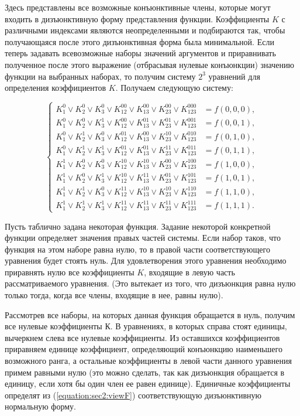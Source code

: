 Здесь представлены все возможные конъюнктивные члены, которые могут входить в дизъюнктивную форму представления функции. Коэффициенты $K$ с различными индексами являются неопределенными и подбираются так, чтобы получающаяся после этого дизъюнктивная форма была минимальной. Если теперь задавать всевозможные наборы значений аргументов и приравнивать полученное после этого выражение (отбрасывая нулевые конъюнкции) значению функции на выбранных наборах, то получим систему $2^3$ уравнений для определения коэффициентов $K$. Получаем следующую систему:

\[
\begin{cases}
K_1^0 \lor K_2^0 \lor K_3^0 \lor K_{12}^{00} \lor K_{13}^{00} \lor K_{23}^{00} \lor K_{123}^{000}&=f(0,0,0),\\
K_1^0 \lor K_2^0 \lor K_3^1 \lor K_{12}^{00} \lor K_{13}^{01} \lor K_{23}^{01} \lor K_{123}^{001}&=f(0,0,1),\\
K_1^0 \lor K_2^1 \lor K_3^0 \lor K_{12}^{01} \lor K_{13}^{00} \lor K_{23}^{10} \lor K_{123}^{010}&=f(0,1,0),\\
K_1^0 \lor K_2^1 \lor K_3^1 \lor K_{12}^{01} \lor K_{13}^{01} \lor K_{23}^{11} \lor K_{123}^{011}&=f(0,1,1),\\
K_1^1 \lor K_2^0 \lor K_3^0 \lor K_{12}^{10} \lor K_{13}^{10} \lor K_{23}^{00} \lor K_{123}^{100}&=f(1,0,0),\\
K_1^1 \lor K_2^0 \lor K_3^1 \lor K_{12}^{10} \lor K_{13}^{11} \lor K_{23}^{01} \lor K_{123}^{101}&=f(1,0,1),\\
K_1^1 \lor K_2^1 \lor K_3^0 \lor K_{12}^{11} \lor K_{13}^{10} \lor K_{23}^{10} \lor K_{123}^{110}&=f(1,1,0),\\
K_1^1 \lor K_2^1 \lor K_3^1 \lor K_{12}^{11} \lor K_{13}^{11} \lor K_{23}^{11} \lor K_{123}^{111}&=f(1,1,1).
\end{cases}
\]

Пусть таблично задана некоторая функция. Задание некоторой конкретной функции определяет значения правых частей системы. Если набор таков, что функция на этом наборе равна нулю, то в правой части соответствующего уравнения будет стоять нуль.
Для удовлетворения этого уравнения необходимо приравнять нулю все коэффициенты $K$, входящие в левую часть рассматриваемого уравнения. (Это вытекает из того, что дизъюнкция равна нулю только тогда, когда все члены, входящие в нее, равны нулю).

Рассмотрев все наборы, на которых данная функция обращается в нуль, получим все нулевые коэффициенты $К$. В уравнениях, в которых справа стоят единицы, вычеркнем слева все нулевые коэффициенты. Из оставшихся коэффициентов приравняем единице коэффициент, определяющий конъюнкцию наименьшего возможного ранга, а остальные коэффициенты в левой части данного уравнения примем равными нулю (это можно сделать, так как дизъюнкция обращается в единицу, если хотя бы один член ее равен единице). Единичные коэффициенты определят из (\ref{equation:sec2:viewF}) соответствующую дизъюнктивную нормальную форму. 
\cite{koeff}

